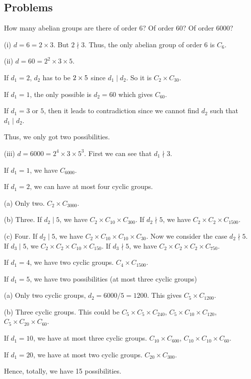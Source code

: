 \subsection{Problems}

\begin{problem}
How many abelian groups are there of order 6? Of order 60? Of order 6000?
\end{problem}

\begin{solution}[\bf Solution.] 
\ben
\item [(i)] $d= 6 = 2\times 3$. But $2\nmid 3$. Thus, the only abelian group of order $6$ is $C_6$.
\item [(ii)] $d = 60 = 2^2 \times 3 \times 5$. 

If $d_1 = 2$, $d_2$ has to be $2\time 3\times 5$ since $d_1 \mid d_2$. So it is $C_2 \times C_{30}$.

If $d_1 = 1$, the only possible is $d_2 = 60$ which gives $C_{60}$. 

If $d_1 = 3$ or $5$, then it leads to contradiction since we cannot find $d_2$ such that $d_1\mid d_2$.

Thus, we only got two possibilities.

\item [(iii)] $d= 6000 = 2^4 \times 3 \times 5^3$. First we can see that $d_1 \nmid 3$. 

If $d_1 = 1$, we have $C_{6000}$.

If $d_1 = 2$, we can have at most four cyclic groups.
\ben
\item [(a)] Only two. $C_2 \times C_{3000}$.
\item [(b)] Three. If $d_2 \mid 5$, we have $C_2 \times C_{10} \times C_{300}$. If $d_2 \nmid 5$, we have $C_2 \times C_2 \times C_{1500}$.
\item [(c)] Four. If $d_2 \mid 5$, we have $C_2 \times C_{10} \times C_{10} \times C_{30}$. Now we consider the case $d_2 \nmid 5$. If $d_3 \mid 5$, we $C_2\times C_2 \times C_{10} \times C_{150}$. If $d_3\nmid 5$, we have $C_2 \times C_2 \times C_2 \times C_{750}$.
\een

If $d_1 = 4$, we have two cyclic groups. $C_4 \times C_{1500}$.

If $d_1 = 5$, we have two possibilities (at most three cyclic groups)
\ben
\item [(a)] Only two cyclic groups, $d_2 = 6000/5 = 1200$. This gives $C_5 \times C_{1200}$.
\item [(b)] Three cyclic groups. This could be $C_5\times C_5 \times C_{240}$, $C_5 \times C_{10} \times C_{120}$, $C_5\times C_{20} \times C_{60}$.
\een

If $d_1 = 10$, we have at most three cyclic groups. $C_{10} \times C_{600}$, $C_{10}\times C_{10} \times C_{60}$.

If $d_1 = 20$, we have at most two cyclic groups. $C_{20} \times C_{300}$.
\een

Hence, totally, we have 15 possibilities. 
\end{solution}


